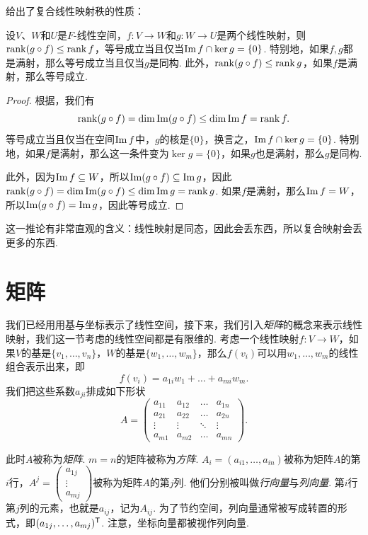  给出了复合线性映射秩的性质：
\begin{corollary}\label{cor:rank-composition}
设$V$、$W$和$U$是$F$-线性空间，$f:V\to W$和$g:W\to U$是两个线性映射，则$\operatorname*{rank} (g\circ f)\leq \operatorname*{rank} f$，等号成立当且仅当$\operatorname*{Im} f\cap \ker g=\{0\}$. 特别地，如果$f,g$都是满射，那么等号成立当且仅当$g$是同构. 此外，$\operatorname*{rank} (g\circ f)\leq \operatorname*{rank} g$，如果$f$是满射，那么等号成立. 
\end{corollary}
\begin{proof}
    根据，我们有
    \[\operatorname*{rank} (g\circ f)=\dim\operatorname*{Im} (g\circ f)\leq \dim \operatorname*{Im} f=\operatorname*{rank} f.\]
    等号成立当且仅当在空间$\operatorname*{Im} f$中，$g$的核是$\{0\}$，换言之，$\operatorname*{Im} f\cap \ker g=\{0\}$. 特别地，如果$f$是满射，那么这一条件变为$\ker g=\{0\}$，如果$g$也是满射，那么$g$是同构. 
    
    此外，因为$\operatorname*{Im} f\subseteq W$，所以$\operatorname*{Im} (g\circ f)\subseteq \operatorname*{Im} g$，因此$\operatorname*{rank} (g\circ f)=\dim\operatorname*{Im} (g\circ f)\leq \dim \operatorname*{Im} g=\operatorname*{rank} g$. 如果$f$是满射，那么$\operatorname*{Im} f=W$，所以$\operatorname*{Im} (g\circ f)=\operatorname*{Im} g$，因此等号成立. 
\end{proof}

这一推论有非常直观的含义：线性映射是同态，因此会丢东西，所以复合映射会丢更多的东西. 

\section{矩阵}\label{sec:matrix}

我们已经用用基与坐标表示了线性空间，接下来，我们引入\textit{矩阵}的概念来表示线性映射，我们这一节考虑的线性空间都是有限维的. 考虑一个线性映射$f:V\to W$，如果$V$的基是$\{v_1,\dots,v_n\}$，$W$的基是$\{w_1,\dots,w_m\}$，那么$f(v_i)$可以用$w_1,\dots,w_m$的线性组合表示出来，即
\[f(v_i)=a_{1i}w_1+\dots+a_{mi}w_m.\]
我们把这些系数$a_{ji}$排成如下形状
\[A=\begin{pmatrix}
a_{11}&a_{12}&\dots&a_{1n}\\
a_{21}&a_{22}&\dots&a_{2n}\\
\vdots&\vdots&\ddots&\vdots\\
a_{m1}&a_{m2}&\dots&a_{mn}
\end{pmatrix}.\]

此时$A$被称为\textit{矩阵}. $m=n$的矩阵被称为\textit{方阵}. $A_i=(a_{i1},\dots,a_{in})$被称为矩阵$A$的第$i$行，$A^j=\begin{pmatrix}a_{1j}\\\vdots\\a_{mj}\end{pmatrix}$被称为矩阵$A$的第$j$列. 他们分别被叫做\textit{行向量}与\textit{列向量}. 第$i$行第$j$列的元素，也就是$a_{ij}$，记为$A_{ij}$. 为了节约空间，列向量通常被写成转置的形式，即$(a_{1j},\dots,a_{mj})^{\mathsf{T}}$. 注意，坐标向量都被视作列向量. 


